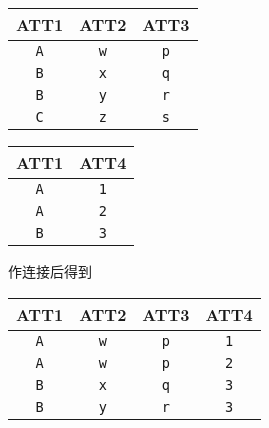 \begin{center}
\begin{tabular}{c|c|c}
    \hline
    \hline
    ATT1    & ATT2 & ATT3 \\
    \hline
    \texttt{A}       & \texttt{w}    & \texttt{p}    \\
    \texttt{B}       & \texttt{x}    & \texttt{q}   \\
    \texttt{B}      & \texttt{y}    & \texttt{r}    \\
    \texttt{C}      & \texttt{z}    & \texttt{s}    \\
    \hline
\end{tabular}
\hspace{2em}
\begin{tabular}{c|c}
    \hline
    \hline
    ATT1    & ATT4 \\
    \hline
    \texttt{A}       & \texttt{1}   \\
    \texttt{A}       & \texttt{2}   \\
    \texttt{B}      & \texttt{3}    \\
    \hline
\end{tabular}
\end{center}

\vspace{1em}
作连接后得到
\vspace{1em}

\begin{center}
\begin{tabular}{c|c|c|c}
    \hline
    \hline
    ATT1        & ATT2  & ATT3   &   ATT4   \\
    \hline
    \texttt{A}  & \texttt{w}    & \texttt{p} &  \texttt{1}  \\
    \texttt{A}  & \texttt{w}    & \texttt{p} &  \texttt{2}  \\
    \texttt{B}  & \texttt{x}    & \texttt{q} &  \texttt{3}  \\
    \texttt{B}  & \texttt{y}    & \texttt{r} &  \texttt{3}  \\
\end{tabular}
\end{center}
\vspace{1em}


